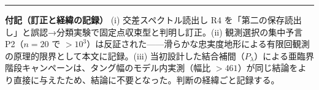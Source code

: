 \documentclass[
  a4paper,
]{ltjsarticle}
\begin{document}
\begin{center}\rule{0.5\linewidth}{0.5pt}\end{center}

\textbf{付記（訂正と経緯の記録）} (i) 交差スペクトル読出し R4
を「第二の保存読出し」と誤認→分類実験で固定点収束型と判明し訂正。(ii)
観測選択の集中予言 P2（\(n=20\) で
\(>10^3\)）は反証された------滑らかな忠実度地形による有限回観測の原理的限界として本文に記録。(iii)
当初設計した結合補間（\(P_\lambda\)）による亜臨界階段キャンペーンは、タング幅のモデル内実測（幅比
\(>461\)）が同じ結論をより直接に与えたため、結論に不要となった。判断の経緯ごと記録する。
\end{document}
